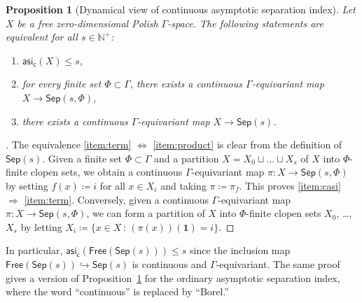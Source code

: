 \documentclass[11pt,reqno,psamsfonts]{amsart}
\theoremstyle{bfnote}
\newtheorem{prop}[theo]{Proposition}
\theoremstyle{definition}
\theoremstyle{remark}
\newcommand{\0}{\varnothing}
\newcommand{\set}[1]{\{#1\}}
\renewcommand{\leq}{\leqslant}
\newcommand{\defeq}{\coloneqq}
\newcommand{\bemph}[1]{{\normalfont#1}}
\newcommand{\ep}[1]{\bemph{(}#1\bemph{)}}
\newcommand{\red}[1]{{\color{red}#1}}
\newcommand{\todo}[1]{\red{\textbf{\upshape{[#1]}}}}
\newcommand{\acts}{\mathrel{\reflectbox{$\righttoleftarrow$}}}
\newcommand{\G}{\Gamma}
\newcommand{\Free}{\mathsf{Free}}
\newcommand{\N}{\mathbb{N}}
\newcommand{\asi}{\mathsf{asi}}
\newcommand{\casi}{\asi_{\mathsf{c}}}
\newcommand{\iden}{\mathbf{1}}
\newcommand{\Sep}{\mathsf{Sep}}
\numberwithin{equation}{section}
\newenvironment{scproof}[1][]{\begin{proof}[\textsc{\upshape{Proof}}#1]}{\end{proof}}
\begin{document}
    \begin{prop}[Dynamical view of continuous asymptotic separation index]\label{prop:map_to_Sep}
        Let $X$ be a free zero-dimensional Polish $\G$-space. %
        The following statements are equivalent for all $s \in \N^+$:
        \begin{enumerate}[label=\ep{\normalfont\roman*}]
            \item\label{item:casi} $\casi(X) \leq s$,
            \item\label{item:term} for every finite set $\Phi \subset \G$, there exists a continuous $\G$-equivariant map $X \to \Sep(s,\Phi)$,
            \item\label{item:product} there exists a continuous $\G$-equivariant map $X \to \Sep(s)$.
        \end{enumerate}
    \end{prop}
    \begin{scproof}
        The equivalence \ref{item:term} $\Longleftrightarrow$ \ref{item:product} is clear from the definition of $\Sep(s)$. Given a finite set $\Phi \subset \G$ and a partition $X = X_0 \sqcup \ldots \sqcup X_s$ of $X$ into $\Phi$-finite clopen sets, we obtain a continuous $\G$-equivariant map $\pi \colon X \to \Sep(s,\Phi)$ by setting $f(x) \defeq i$ for all $x \in X_i$ and taking $\pi \defeq \pi_f$. This proves \ref{item:casi} $\Longrightarrow$ \ref{item:term}. Conversely, given a continuous $\G$-equivariant map $\pi \colon X \to \Sep(s,\Phi)$, we can form a partition of $X$ into $\Phi$-finite clopen sets $X_0$, \ldots, $X_s$ by letting $X_i \defeq \set{x \in X \,:\, (\pi(x))(\iden) = i}$.
    \end{scproof}

    In particular, $\casi(\Free(\Sep(s))) \leq s$ since the inclusion map $\Free(\Sep(s)) \hookrightarrow \Sep(s)$ is continuous and $\G$-equivariant. The same proof gives a version of Proposition~\ref{prop:map_to_Sep} for the ordinary asymptotic separation index, where the word ``continuous'' is replaced by ``Borel.'' %
\end{document}
